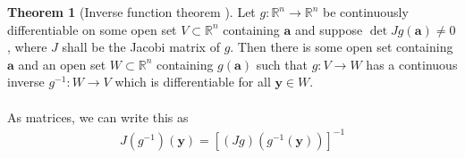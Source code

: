 \documentclass[12pt, a4paper]{article}
\numberwithin{equation}{section}
\theoremstyle{definition}
\theoremstyle{definition}
\newtheorem{theorem}[thm]{Theorem}
\begin{document}
	\begin{theorem}[Inverse function theorem \cite{IFT}] Let $g: \mathbb R^n \rightarrow \mathbb R^n$ be continuously differentiable on some open set $V\subset \mathbb R^n$ containing $\mathbf{a}$ and suppose $\det Jg(\mathbf{a}) \ne 0$, where $J$ shall be the Jacobi matrix of $g$. Then there is some open set containing $\mathbf{a}$ and an open set $W\subset \mathbb{R}^n$ containing $g(\mathbf{a})$ such that $g: V\rightarrow W$ has a continuous inverse $g^{-1}: W\rightarrow V$ which is differentiable for all $\mathbf{y}\in W$. 
		\\ \\	
		As matrices, we can write this as 
		\begin{align}
			J(g^{-1})(\mathbf{y}) = \left[\left(Jg\right)\left(g^{-1}(\mathbf{y})\right)\right] ^{-1}
		\end{align} 
	\end{theorem}
	
\end{document}
